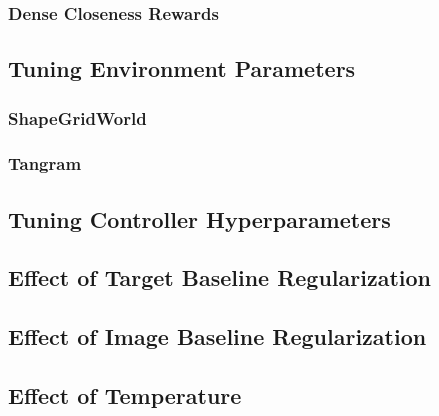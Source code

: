 \subsubsection{Dense Closeness Rewards}
\label{sec:dense-closeness}


\subsection{Tuning Environment Parameters}
\label{sec:env-hyperparameters}


\subsubsection{ShapeGridWorld}
\label{sec:sgw-parameters}


\subsubsection{Tangram}
\label{sec:tangram-parameters}


\subsection{Tuning Controller Hyperparameters}
\label{sec:icem-hyperparameters}


\subsection{Effect of Target Baseline Regularization}
\label{sec:reg-alpha}


\subsection{Effect of Image Baseline Regularization}
\label{sec:reg-beta}


\subsection{Effect of Temperature}
\label{sec:reg-temperature}


